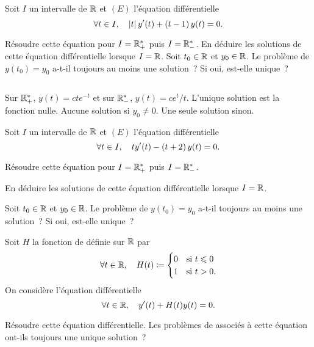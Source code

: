 \documentclass{magnolia}
\begin{document}

Soit $I$ un intervalle de $\mathbb{R}$ et $(E)$ l'équation différentielle
$$\forall t\in I ,\quad \left|t\right|y'(t)+\left(t-1\right)y(t)=0.$$
\begin{questions}
\question Résoudre cette équation pour $I=\mathbb{R}_+^*$ puis $I=\mathbb{R}_-^*$.
\question En déduire les solutions de cette équation différentielle lorsque
  $I=\mathbb{R}$.
\question Soit $t_0\in\mathbb{R}$ et $y_0\in\mathbb{R}$. Le problème de  $y(t_0)=y_0$
  a-t-il toujours au moins une solution~? Si oui, est-elle unique~?
\end{questions}
\begin{sol}
$\quad$
\begin{questions}
\question Sur $\mathbb{R}_+^*$, $y(t)=cte^{-t}$ et sur $\mathbb{R}_-^*$, $y(t)=ce^t/t$.
\question L'unique solution est la fonction nulle.
\question Aucune solution si $y_0\neq 0$. Une seule solution sinon. 
\end{questions}
\end{sol}

Soit $I$ un intervalle de $\mathbb{R}$ et $(E)$ l'équation différentielle
$$\forall t\in I ,\quad ty'(t)-\left(t+2\right)y(t)=0.$$
\begin{questions}
\item Résoudre cette équation pour $I=\mathbb{R}_+^*$ puis $I=\mathbb{R}_-^*$.
\item En déduire les solutions de cette équation différentielle lorsque $I=\mathbb{R}$.
\item Soit $t_0\in\mathbb{R}$ et $y_0\in\mathbb{R}$. Le problème de  $y(t_0)=y_0$ a-t-il
  toujours au moins une solution~? Si oui, est-elle unique~?
\end{questions}

Soit $H$ la fonction de  définie sur $\mathbb{R}$ par
$$\forall t\in\mathbb{R} ,\quad H(t)\coloneqq
\begin{cases}
  0 & \text{si $t\leqslant 0$}\\
  1 & \text{si $t>0$}.
\end{cases}
$$
On considère l'équation différentielle
$$\forall t\in\mathbb{R} ,\quad y'(t)+H(t)y(t)=0.$$
\begin{questions}
\question Résoudre cette équation différentielle.
\question Les problèmes de  associés à cette équation ont-ils toujours
  une unique solution~?
\end{questions}
\end{document}
